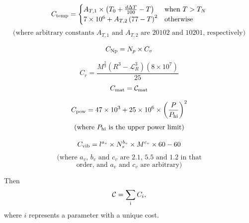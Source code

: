 \documentclass{article}
\begin{document}
    \begin{equation}C_{\rm temp} = \begin{cases}
                 A_{T, 1}\times\left(T_0 + \frac{d\Delta T}{100} - T\right) & \text{when $T > T_N$} \\
                 7 \times 10^6 + A_{T, 2}\left(77 - T\right)^2 & \text{otherwise}
                 \end{cases}
    \end{equation}
    \begin{equation}
    \text{(where arbitrary constants $A_{T, 1}$ and $A_{T, 2}$ are 20102 and 10201, respectively)}
    \end{equation}
 \begin{multicols}{2}   
    \begin{equation}C_{\rm Np} = N_p \times C_v
    \end{equation}

        \begin{equation}C_{r} =\frac{M^{\frac{2}{3}}(R^3 - \mathcal{L}_R^3)(8 \times 10^7)}{25}
    \end{equation}
    \break
    \begin{equation}C_{\rm mat} = \mathcal{C}_{\rm mat}
    \end{equation}

    \begin{equation}C_{\rm pow} = 47 \times 10^3 + 25 \times 10 ^ 6 \times \left(\frac{P}{P_{\rm hi}}\right)^2 
    \end{equation}
    \begin{equation}
    \text{(where $P_{\rm hi}$ is the upper power limit)}
    \end{equation}

    \begin{equation}C_{\rm vib} = l^{a_v} \times N_s^{b_v} \times M^{c_v} \times 60 - 60
    \end{equation}
    \begin{equation}
    \text{(where $a_v$, $b_v$ and $c_v$ are 2.1, 5.5 and 1.2 in that}
    \end{equation}
    \begin{equation}
    \text{order, and $a_v$ and $c_v$ are arbitrary)}
    \end{equation}
 \end{multicols}   

Then
\begin{equation}
\mathcal{C} = \sum_{\rm i} C_i,
\end{equation}
where $i$ represents a parameter with a unique cost.
\end{document}
